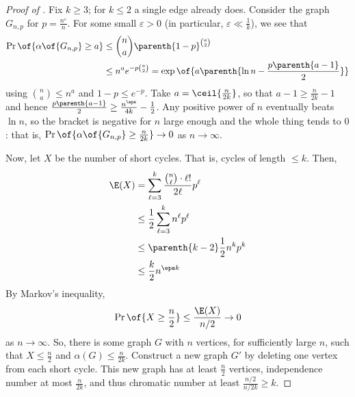 \begin{proof}[Proof of ]
    Fix $k \geq 3$; for $k \leq 2$ a single edge already does. Consider the graph $G_{n, p}$ for $p = \frac{n^{\varepsilon}}{n}$. For some small $\varepsilon > 0$ (in particular, $\varepsilon \ll \frac{1}{k}$), we see that
    \begin{align*}
        \Pr\of{\alpha\of{G_{n, p}} \geq a} &\leq \binom{n}{a} \parenth{1 - p}^{\binom{a}{2}}  \\
        & \leq n^a e^{-p \binom{a}{2}} = \exp\of{a \parenth{\ln n - \frac{p \parenth{a - 1}}{2}}}
    \end{align*}
    using $\binom{n}{a} \leq n^a$ and $1 - p \leq e^{-p}$. Take $a = \ceil{\frac{n}{2k}}$, so that $a - 1 \geq \frac{n}{2k} - 1$ and hence $\frac{p \parenth{a - 1}}{2} \geq \frac{n^{\eps}}{4k} - \frac{1}{2}$. Any positive power of $n$ eventually beats $\ln n$, so the bracket is negative for $n$ large enough and the whole thing tends to $0$: that is, $\Pr\of{\alpha\of{G_{n, p}} \geq \frac{n}{2k}} \to 0$ as $n \to \infty$.

    Now, let $X$ be the number of short cycles. That is, cycles of length $\leq k$. Then,
    \begin{align*}
        \E(X) &= \sum_{\ell = 3}^{k} \frac{\binom{n}{\ell} \cdot \ell !}{2\ell} p^{\ell} \\
        &\leq \frac{1}{2} \sum_{\ell = 3}^{k} n^{\ell} p^{\ell} \\
        &\leq \parenth{k - 2} \frac{1}{2} n^k p^k \\
        &\leq \frac{k}{2} n^{\eps k}
    \end{align*}
    By Markov's inequality,
    \begin{align*}
        \Pr\of{X \geq \frac{n}{2}} \leq \frac{\E(X)}{n / 2} \to 0
    \end{align*}
    as $n \to \infty$. So, there is some graph $G$ with $n$ vertices, for sufficiently large $n$, such that $X \leq \frac{n}{2}$ and $\alpha(G) \leq \frac{n}{2k}$. Construct a new graph $G'$ by deleting one vertex from each short cycle. This new graph has at least $\frac{n}{2}$ vertices, independence number at most $\frac{n}{2k}$, and thus chromatic number at least $\frac{n/2}{n/2k} \geq k$.
\end{proof}
